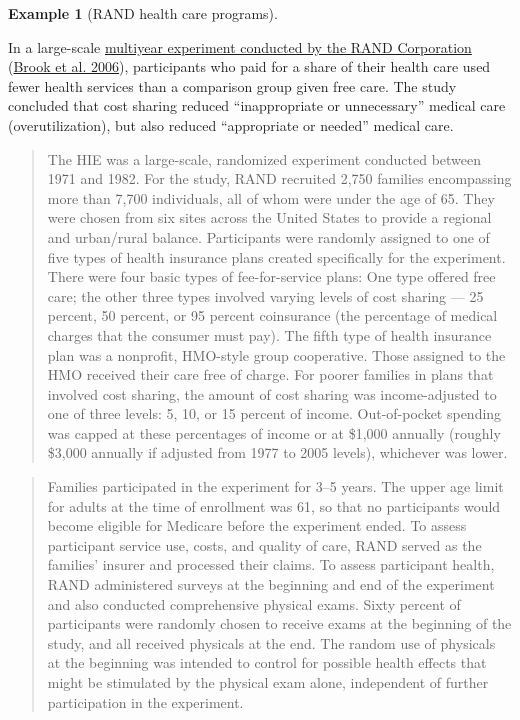 \documentclass[
  11pt,
  letterpaper,
]{scrbook}
\theoremstyle{definition}
\newtheorem{example}{Example}[chapter]
\theoremstyle{remark}
\begin{document}
\begin{example}[RAND health care
programs]\protect\hypertarget{exm-randcorp}{}\label{exm-randcorp}

In a large-scale
\href{https://www.rand.org/health-care/projects/hie.html}{multiyear
experiment conducted by the RAND Corporation}
(\protect\hyperlink{ref-RANDHIE}{Brook et al. 2006}), participants who
paid for a share of their health care used fewer health services than a
comparison group given free care. The study concluded that cost sharing
reduced ``inappropriate or unnecessary'' medical care (overutilization),
but also reduced ``appropriate or needed'' medical care.

\begin{quote}
The HIE was a large-scale, randomized experiment conducted between 1971
and 1982. For the study, RAND recruited 2,750 families encompassing more
than 7,700 individuals, all of whom were under the age of 65. They were
chosen from six sites across the United States to provide a regional and
urban/rural balance. Participants were randomly assigned to one of five
types of health insurance plans created specifically for the experiment.
There were four basic types of fee-for-service plans: One type offered
free care; the other three types involved varying levels of cost sharing
--- 25 percent, 50 percent, or 95 percent coinsurance (the percentage of
medical charges that the consumer must pay). The fifth type of health
insurance plan was a nonprofit, HMO-style group cooperative. Those
assigned to the HMO received their care free of charge. For poorer
families in plans that involved cost sharing, the amount of cost sharing
was income-adjusted to one of three levels: 5, 10, or 15 percent of
income. Out-of-pocket spending was capped at these percentages of income
or at \$1,000 annually (roughly \$3,000 annually if adjusted from 1977
to 2005 levels), whichever was lower.
\end{quote}

\begin{quote}
Families participated in the experiment for 3--5 years. The upper age
limit for adults at the time of enrollment was 61, so that no
participants would become eligible for Medicare before the experiment
ended. To assess participant service use, costs, and quality of care,
RAND served as the families' insurer and processed their claims. To
assess participant health, RAND administered surveys at the beginning
and end of the experiment and also conducted comprehensive physical
exams. Sixty percent of participants were randomly chosen to receive
exams at the beginning of the study, and all received physicals at the
end. The random use of physicals at the beginning was intended to
control for possible health effects that might be stimulated by the
physical exam alone, independent of further participation in the
experiment.
\end{quote}

\end{example}
\end{document}
